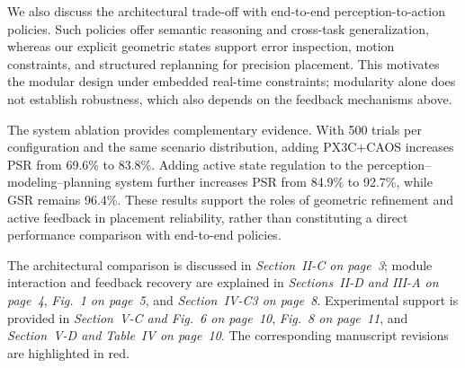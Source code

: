 \documentclass[journal,10pt]{IEEEtran}
\begin{document}
We also discuss the architectural trade-off with end-to-end perception-to-action policies. Such policies offer semantic reasoning and cross-task generalization, whereas our explicit geometric states support error inspection, motion constraints, and structured replanning for precision placement. This motivates the modular design under embedded real-time constraints; modularity alone does not establish robustness, which also depends on the feedback mechanisms above.

The system ablation provides complementary evidence. With 500 trials per configuration and the same scenario distribution, adding PX3C+CAOS increases PSR from 69.6\% to 83.8\%. Adding active state regulation to the perception--modeling--planning system further increases PSR from 84.9\% to 92.7\%, while GSR remains 96.4\%. These results support the roles of geometric refinement and active feedback in placement reliability, rather than constituting a direct performance comparison with end-to-end policies.

The architectural comparison is discussed in \textit{Section~II-C on page~3}; module interaction and feedback recovery are explained in \textit{Sections~II-D and III-A on page~4}, \textit{Fig.~1 on page~5}, and \textit{Section~IV-C3 on page~8}. Experimental support is provided in \textit{Section~V-C and Fig.~6 on page~10}, \textit{Fig.~8 on page~11}, and \textit{Section~V-D and Table~IV on page~10}. The corresponding manuscript revisions are highlighted in red.
\end{document}
